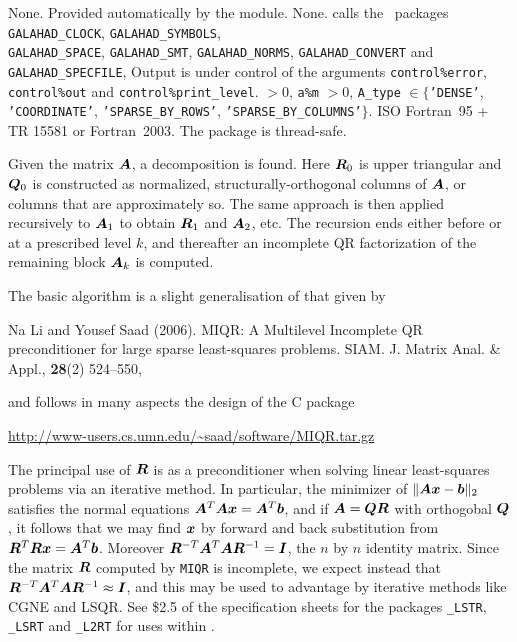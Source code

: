 \documentclass{galahad}
\newcommand{\packagename}{MIQR}
\begin{document}

\galgeneral

\galcommon None.
\galworkspace Provided automatically by the module.
\galroutines None. 
\galmodules {\tt \packagename\_form} calls the \galahad\ packages
{\tt GALAHAD\_CLOCK},
{\tt GALAHAD\_SY\-M\-BOLS}, \\
{\tt GALAHAD\-\_SPACE},
{\tt GALAHAD\_SMT},
{\tt GALAHAD\_NORMS},
{\tt GALAHAD\_CONVERT} and
{\tt GALAHAD\_SPECFILE},
\galio Output is under control of the arguments
 {\tt control\%error}, {\tt control\%out} and {\tt control\%print\_level}.
 $> 0$, {\tt a\%m} $>  0$, 
{\tt A\_type} $\in \{${\tt 'DENSE'},  {\tt 'COORDINATE'}, 
{\tt 'SPARSE\_BY\_ROWS'}, {\tt 'SPARSE\_BY\_COLUMNS'}$\}$. 
\galportability ISO Fortran~95 + TR 15581 or Fortran~2003. 
The package is thread-safe.



\galmethod

Given the matrix ${\bm{A}}$, a decomposition
is found. Here ${\bm{R}}_0$ is upper triangular and 
${\bm{Q}}_0$ is constructed as normalized,
structurally-orthogonal columns of ${\bm{A}}$, or columns that are approximately
so. The same approach is then applied
recursively to ${\bm{A}}_1$ to obtain ${\bm{R}}_1$ and ${\bm{A}}_2$, etc. The
recursion ends either before or at a prescribed level $k$, and thereafter
an incomplete QR factorization of the remaining block ${\bm{A}}_k$ is computed.

\noindent
The basic algorithm is a slight generalisation of that given by
\vspace*{1mm}

\noindent
Na Li and Yousef Saad (2006).
MIQR: A Multilevel Incomplete QR preconditioner for large sparse 
least-squares problems.
SIAM. J. Matrix Anal. \& Appl., {\bf 28}(2) 524--550,
\vspace*{1mm}

\noindent
and follows in many aspects the design of the C package

\url{http://www-users.cs.umn.edu/~saad/software/MIQR.tar.gz}

\noindent
The principal use of ${\bm{R}}$ is as a preconditioner when solving
linear least-squares problems via an iterative method. In particular,
the minimizer of $\|{\bm{A}}{\bm{x}}-{\bm{b}}\|_2$ satisfies the normal equations
${\bm{A}}^T {\bm{A}} {\bm{x}} = {\bm{A}}^T {\bm{b}}$, and if ${\bm{A}} = {\bm{Q}} {\bm{R}}$
with orthogobal ${\bm{Q}}$, it follows
that we may find ${\bm{x}}$ by forward and back substitution from
${\bm{R}}^T {\bm{R}} {\bm{x}} = {\bm{A}}^T {\bm{b}}$. Moreover 
${\bm{R}}^{-T} {\bm{A}}^T {\bm{A}} {\bm{R}}^{-1} = {\bm{I}}$, 
the $n$ by $n$ identity matrix. Since the matrix ${\bm{R}}$
computed by {\tt \packagename} is incomplete, we expect instead that
${\bm{R}}^{-T} {\bm{A}}^T {\bm{A}} {\bm{R}}^{-1} \approx {\bm{I}}$, and this may be used
to advantage by iterative methods like CGNE and LSQR. See \$2.5 of
the specification sheets for the packages
{\tt \libraryname\_LSTR},
{\tt \libraryname\_LSRT} 
and 
{\tt \libraryname\_L2RT} for uses within \galahad.
\end{document}

